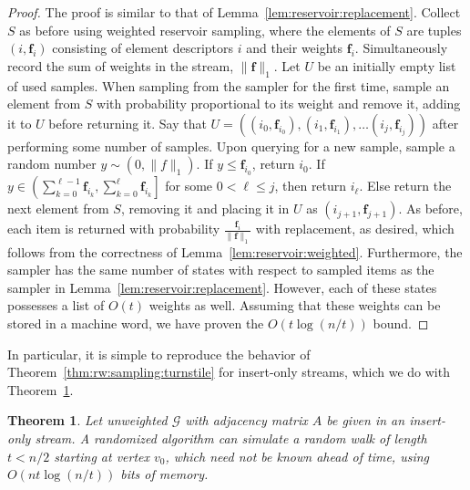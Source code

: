\documentclass{report}
\newtheorem{theorem}{Theorem}[section]
\begin{document}
%
\begin{proof}
The proof is similar to that of Lemma~\ref{lem:reservoir:replacement}.
Collect $S$ as before using weighted reservoir sampling, where the elements of $S$ are tuples $(i,\mathbf{f}_i)$ consisting of element descriptors $i$ and their weights $\mathbf{f}_i$.
Simultaneously record the sum of weights in the stream, $\|\mathbf{f}\|_1$.
Let $U$ be an initially empty list of used samples. 
When sampling from the sampler for the first time, sample an element from $S$ with probability proportional to its weight and remove it, adding it to $U$ before returning it.
Say that $U = ((i_0, \mathbf{f}_{i_0}), (i_1, \mathbf{f}_{i_1}), \dots (i_j, \mathbf{f}_{i_j}))$ after performing some number of samples.
Upon querying for a new sample, sample a random number $y \sim (0, \|f\|_1)$.
If $y \leq \mathbf{f}_{i_0}$, return $i_0$.
If $y \in \left ( \sum_{k=0}^{\ell-1}\mathbf{f}_{i_{k}}, \sum_{k=0}^{\ell}\mathbf{f}_{i_{k}} \right ]$ for some $0 < \ell \leq j$, then return $i_\ell$.
Else return the next element from $S$, removing it and placing it in $U$ as $(i_{j+1}, \mathbf{f}_{j+1})$.
As before, each item is returned with probability $\frac{\mathbf{f}_i}{\|\mathbf{f}\|_1}$ with replacement, as desired, which follows from the correctness of Lemma~\ref{lem:reservoir:weighted}.
Furthermore, the sampler has the same number of states with respect to sampled items as the sampler in Lemma~\ref{lem:reservoir:replacement}.
However, each of these states possesses a list of $O(t)$ weights as well.
Assuming that these weights can be stored in a machine word, we have proven the $O(t\log(n/t))$ bound.
\end{proof}
%

In particular, it is simple to reproduce the behavior of Theorem~\ref{thm:rw:sampling:turnstile} for insert-only streams, which we do with Theorem~\ref{thm:rw:sampling:insert-only}.
%
\begin{theorem} \label{thm:rw:sampling:insert-only}
Let unweighted $\mathcal{G}$ with adjacency matrix $A$ be given in an insert-only stream.
A randomized algorithm can simulate a random walk of length $t < n/2$ starting at vertex $v_0$, which need not be known ahead of time, using $O(nt \log (n/t))$ bits of memory.
\end{theorem}
\end{document}
